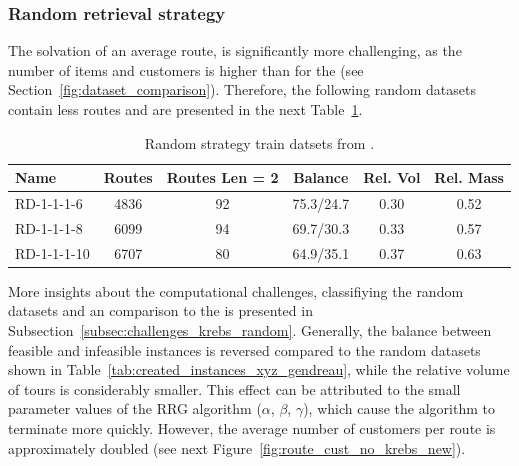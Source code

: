 \subsubsection{Random retrieval strategy}
The solvation of an average route, is significantly more challenging, as the number of items and customers is higher than for the
\gendreauDataSetText (see Section~\ref{fig:dataset_comparison}). Therefore, the following random datasets contain less routes and are presented in
the next Table~\ref{tab:random_instances_krebs}.
\begin{table}[ht]
    \centering
    \begin{tabular}{l c c c c c }
        \toprule
        Name        & Routes & Routes Len = 2 & Balance   & Rel. Vol & Rel. Mass \\
        \midrule
        RD-1-1-1-6  & 4836   & 92             & 75.3/24.7 & 0.30     & 0.52      \\
        RD-1-1-1-8  & 6099   & 94             & 69.7/30.3 & 0.33     & 0.57      \\
        RD-1-1-1-10 & 6707   & 80             & 64.9/35.1 & 0.37     & 0.63      \\

        \bottomrule
    \end{tabular}
    \caption{Random strategy train datsets from \krebsADataSet.}
    \label{tab:random_instances_krebs}
\end{table}
More insights about the computational challenges, classifiying the random datasets and an comparison to the \gendreauDataSetText is presented
in Subsection~\ref{subsec:challenges_krebs_random}. Generally, the balance between feasible and infeasible instances is reversed
compared to the random datasets shown in Table~\ref{tab:created_instances_xyz_gendreau}, while the relative volume of tours
is considerably smaller. This effect can be attributed to the small parameter values of the \gls{RRG} algorithm ($\alpha$, $\beta$, $\gamma$),
which cause the algorithm to terminate more quickly. However, the average number of
customers per route is approximately doubled (see next Figure~\ref{fig:route_cust_no_krebs_new}).


